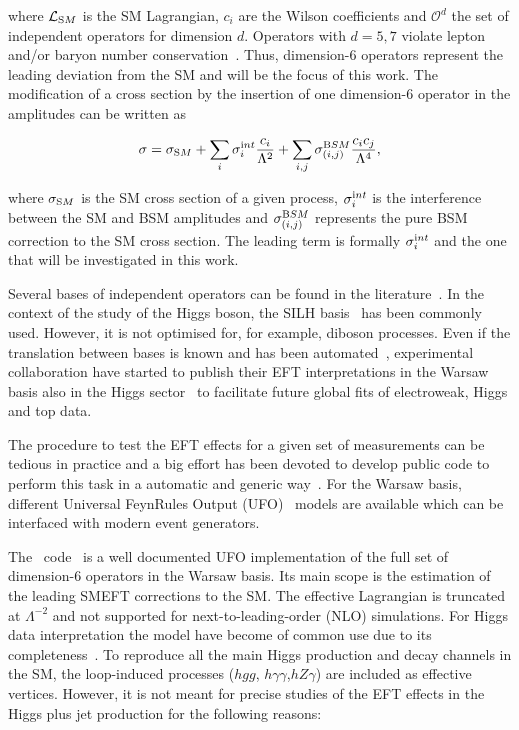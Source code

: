 where $\mathcal{L}_{\textrm SM}$ is the SM Lagrangian, $c_i$ are the Wilson coefficients and ${\mathcal{O}^{d}}$ the set of independent operators for dimension $d$. Operators with $d=5,7$  violate lepton and/or baryon number conservation~\cite{Degrande:2012wf,Kobach:2016ami}. Thus, dimension-6 operators represent the leading deviation from the SM and will be the focus of this work. The modification of a cross section by the insertion of one dimension-6 operator in the amplitudes can be written as

\begin{equation}
\sigma = \sigma_{\textrm SM} + \sum_{i}\sigma_i^{\textrm int} \frac{c_i}{\Lambda^{2}} + \sum_{i,j}\sigma_{(i,j)}^{\textrm BSM} \frac{c_ic_j}{\Lambda^{4}},
\end{equation}  

where $\sigma_{\textrm SM}$ is the SM cross section of a given process, $\sigma_i^{\textrm int}$ is the interference between the SM and BSM amplitudes and $\sigma_{(i,j)}^{\textrm BSM}$ represents the pure BSM correction to the SM cross section. The leading term is formally $\sigma_i^{\textrm int}$ and the one that will be investigated in this work. 

Several bases of independent operators can be found in the literature~\cite{Grzadkowski:2010es,Contino:2013kra,Gupta:2014rxa,Masso:2014xra}. In the context of the study of the Higgs boson, the SILH basis~\cite{Contino:2013kra} has been commonly used. However, it is not optimised for, for example, diboson processes. Even if the translation between bases is known and has been automated~\cite{Falkowski:2015wza,Aebischer:2017ugx}, experimental collaboration have started to publish their EFT interpretations in the Warsaw basis also in the Higgs sector~\cite{ATLAS:2019jst,ATL-PHYS-PUB-2019-042} to facilitate future global fits of electroweak, Higgs and top data.

The procedure to test the EFT effects for a given set of measurements can be tedious in practice and a big effort has been devoted to develop public code to perform this task in a automatic and generic way~\cite{Brivio:2019irc}. For the Warsaw basis, different Universal FeynRules Output (UFO)~\cite{Degrande:2011ua} models are available which can be interfaced with modern event generators.

The \SMEFTsim\ code~\cite{Brivio:2017btx} is a well documented UFO implementation of the full set of dimension-6 operators in the Warsaw basis. Its main scope is the estimation of the leading SMEFT corrections to the SM. The effective Lagrangian is truncated at $\Lambda^{-2}$ and not supported for next-to-leading-order (NLO) simulations. For Higgs data interpretation the model have become of common use due to its completeness~\cite{Ellis:2018gqa,Falkowski:2019hvp,ATLAS:2019jst}.  To reproduce all the main Higgs production and decay channels in the SM, the loop-induced processes ($hgg$, $h\gamma\gamma$,$hZ\gamma$) are included as effective vertices. However, it is not meant for precise studies of the EFT effects in the Higgs plus jet production for the following reasons:

